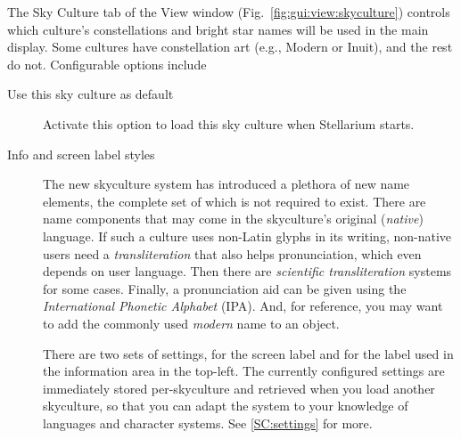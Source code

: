 The Sky Culture tab of the View window (Fig.~\ref{fig:gui:view:skyculture})
controls which culture's constellations and bright star names will be
used in the main display.  Some cultures have constellation art (e.g.,
Modern or Inuit), and the rest do not. Configurable options include
\begin{description}
\item[Use this sky culture as default] Activate this option to load
  this sky culture when Stellarium starts.
\item[Info and screen label styles] 


The new skyculture system has introduced a plethora of new name elements, 
the complete set of which is not required to exist. There are name components that may come 
in the skyculture's original (\emph{native}) language. If such a culture uses non-Latin glyphs in its writing, 
non-native users need a \emph{transliteration} that also helps pronunciation, which even depends on user language. 
Then there are \emph{scientific transliteration} systems for some cases. 
Finally, a pronunciation aid can be given using the \emph{International Phonetic Alphabet} (IPA).
And, for reference, you may want to add the commonly used \emph{modern} name to an object. 

There are two sets of settings, for the screen label and for the label used in the information area in the top-left. 
The currently configured settings are immediately stored per-skyculture and retrieved when you load another skyculture, 
so that you can adapt the system to your knowledge of languages and character systems. See \ref{SC:settings} for more.


\end{description}
